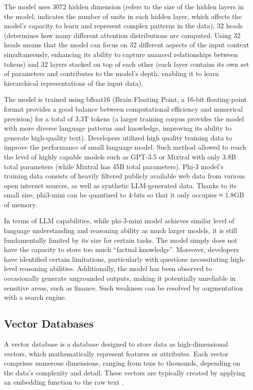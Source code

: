 The model uses 3072 hidden dimension (refers to the size of the hidden layers in the model, indicates the number of units in each hidden layer, which affects the model's capacity to learn and represent complex patterns in the data), 32 heads (determines how many different attention distributions are computed. Using 32 heads means that the model can focus on 32 different aspects of the input context simultaneously, enhancing its ability to capture nuanced relationships between tokens) and 32 layers stacked on top of each other (each layer contains its own set of parameters and contributes to the model's depth, enabling it to learn hierarchical representations of the input data). 

The model is trained using bfloat16 (Brain Floating Point, a 16-bit floating-point format provides a good balance between computational efficiency and numerical precision) for a total of 3.3T tokens (a larger training corpus provides the model with more diverse language patterns and knowledge, improving its ability to generate high-quality text). Developers utilized high quality training data to improve the performance of small language model. Such method allowed to reach the level of highly capable models such as GPT-3.5 or Mixtral with only 3.8B total parameters (while Mixtral has 45B total parameters). Phi-3 model's training data consists of heavily filtered publicly available web data from various open internet sources, as
well as synthetic LLM-generated data. Thanks to its small size, phi3-mini can be quantized to 4-bits so that it only occupies ≈ 1.8GB of memory. \cite{Abdin.22Apr2024}

In terms of LLM capabilities, while phi-3-mini model achieves similar level of language understanding and reasoning ability as much larger models, it is still fundamentally limited by its size for certain tasks. The model simply does not have the capacity to store too much “factual knowledge”. Moreover, developers have identified certain limitations, particularly with questions necessitating high-level reasoning abilities. Additionally, the model has been observed to occasionally generate ungrounded outputs, making it potentially unreliable in sensitive areas, such as finance. Such weakness can be resolved by augmentation with a search engine. \cite{Abdin.22Apr2024}


\subsection{Vector Databases}
A vector database is a database designed to store data as high-dimensional vectors, which mathematically represent features or attributes. Each vector comprises numerous dimensions, ranging from tens to thousands, depending on the data's complexity and detail. These vectors are typically created by applying an embedding function to the raw text \cite{Han.18Oct2023}. 

